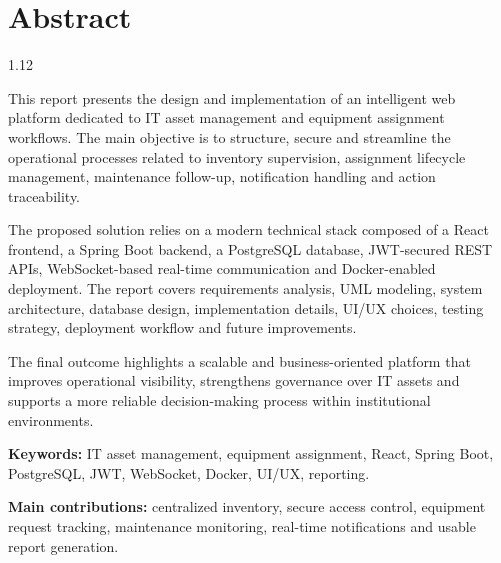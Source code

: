 ﻿\documentclass[12pt,a4paper,oneside]{report}
\newcommand{\frontmatterchapter}[1]{
  \chapter*{#1}
  \addcontentsline{toc}{chapter}{#1}
}
\newenvironment{frontmattertext}{
  \begin{spacing}{1.12}
  \normalsize
  \setlength{\parskip}{0.45em}
}{
  \end{spacing}
}
\begin{document}
\frontmatterchapter{Abstract}
\begin{frontmattertext}
This report presents the design and implementation of an intelligent web platform dedicated to IT asset management and equipment assignment workflows. The main objective is to structure, secure and streamline the operational processes related to inventory supervision, assignment lifecycle management, maintenance follow-up, notification handling and action traceability.

The proposed solution relies on a modern technical stack composed of a React frontend, a Spring Boot backend, a PostgreSQL database, JWT-secured REST APIs, WebSocket-based real-time communication and Docker-enabled deployment. The report covers requirements analysis, UML modeling, system architecture, database design, implementation details, UI/UX choices, testing strategy, deployment workflow and future improvements.

The final outcome highlights a scalable and business-oriented platform that improves operational visibility, strengthens governance over IT assets and supports a more reliable decision-making process within institutional environments.

\textbf{Keywords:} IT asset management, equipment assignment, React, Spring Boot, PostgreSQL, JWT, WebSocket, Docker, UI/UX, reporting.

\textbf{Main contributions:} centralized inventory, secure access control, equipment request tracking, maintenance monitoring, real-time notifications and usable report generation.
\end{frontmattertext}
\end{document}
